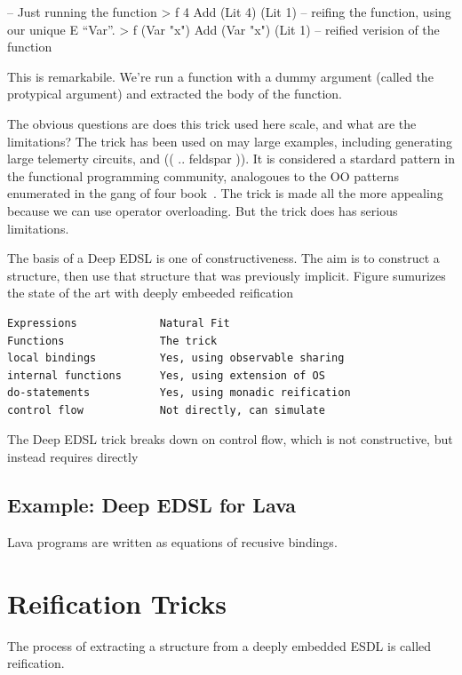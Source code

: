 \documentclass[11pt]{article}
\begin{document}
\begin{Code}
-- Just running the function
> f 4
Add (Lit 4) (Lit 1)
-- reifing the function, using our unique E ``Var''.
> f (Var "x")
Add (Var "x") (Lit 1)   -- reified verision of the function
\end{Code}

This is remarkabile. We're run a function with 
a dummy argument (called the protypical argument)
and extracted the body of the function.

The obvious questions are does this trick used here scale,
and what are the limitations? The trick has
been used on may large examples, including
generating large telemerty circuits, 
and (( .. feldspar )). It is considered a
stardard pattern in the functional programming
community, analogoues to the OO patterns
enumerated in the gang of four book~\cite{..}.
The trick is made all the more appealing
because we can use operator overloading.
But the trick does has serious limitations.

The basis of a Deep EDSL is one of constructiveness.
The aim is to construct a structure, then
use that structure that was previously implicit.
Figure sumurizes the state of the art with
deeply embeeded reification

\begin{verbatim}
Expressions             Natural Fit
Functions               The trick
local bindings          Yes, using observable sharing
internal functions      Yes, using extension of OS
do-statements           Yes, using monadic reification
control flow            Not directly, can simulate
\end{verbatim}

The Deep EDSL trick breaks down on control flow,
which is not constructive, but instead requires
directly 

\subsection{Example: Deep EDSL for Lava}

Lava programs are written as equations of recusive bindings.


\section{Reification Tricks}

The process of extracting a structure from a deeply embedded ESDL
is called reification. 
\end{document}

